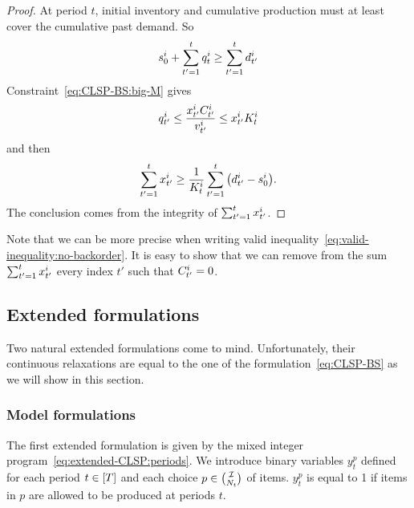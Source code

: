 \begin{proof}
At period $t$, initial inventory and cumulative production must at least cover the cumulative past demand.
So
\begin{equation}
  s_0^i + \sum_{t'=1}^{t} q_t^i \ge \sum_{t'=1}^{t}d_{t'}^i
\end{equation}
Constraint~\eqref{eq:CLSP-BS:big-M} gives
\begin{equation}
  q_{t'}^i \le \frac{x_{t'}^iC_{t'}^i}{v_{t'}^i} \le x_{t'}^i K_t^i
\end{equation}
and then
\begin{equation}
  \sum_{t'=1}^t\setup_{t'}^i \ge \frac{1}{K_t^i}\sum_{t'=1}^t\bracket{\demand_{t'}^i-\inventory_0^i}.
\end{equation}
The conclusion comes from the integrity of $\sum_{t'=1}^tx_{t'}^i$.
\end{proof}

Note that we can be more precise when writing valid inequality~\eqref{eq:valid-inequality:no-backorder}.
It is easy to show that we can remove from the sum $\sum_{t'=1}^{t}x_{t'}^i$ every index $t'$ such that $C_{t'}^i=0$.





\subsection{Extended formulations}
\label{sec:PDP:deterministic:theoretical-results:extended-formulations}


Two natural extended formulations come to mind.
Unfortunately, their continuous relaxations are equal to the one of the formulation~\eqref{eq:CLSP-BS} as we will show in this section.



\subsubsection{Model formulations}

The first extended formulation is given by the mixed integer program~\eqref{eq:extended-CLSP:periods}.
We introduce binary variables $y_t^p$ defined for each period $t\in\range{\horizon}$ and each choice $p\in{\mathcal{I}\choose N_t}$ of items.
$y_t^p$ is equal to 1 if items in $p$ are allowed to be produced at periods $t$.

